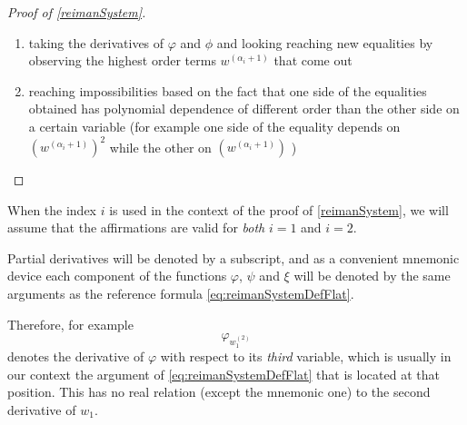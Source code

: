 \documentclass[12pt]{article}
\begin{document}
\begin{proof}[ Proof of \ref{reimanSystem}]
\begin{enumerate}
  \item taking the derivatives of $\varphi$ and $\phi$ and looking reaching new
  equalities by observing the highest order terms $w^{(\alpha_i + 1)}$ that come out
  \item reaching impossibilities based on the fact that one side of the equalities
  obtained has polynomial dependence of different order than the other side on a
  certain variable (for example one side of the equality depends on $(w^{(\alpha_i + 1)})^2$ while the other on $(w^{(\alpha_i + 1)})$ )
\end{enumerate}

\end{proof}

\begin{notation}[Index $i$] \label{indexIIsForOneAndTwo}
  When the index $i$ is used in the context of the proof of \ref{reimanSystem},
  we will assume that the affirmations are valid for \emph{both} $i=1$ and $i=2$.
\end{notation}

\begin{notation}[Derivatives] \label{derivativesOfComplicatedThings}
  Partial derivatives will be denoted by a subscript, and as a convenient mnemonic device
  each component of the functions $\varphi$, $\psi$ and $\xi$ will be denoted by the same arguments
  as the reference formula \eqref{eq:reimanSystemDefFlat}.
  
  Therefore, for example
  \[ \varphi_{w_1^{(2)}} \]
  denotes the derivative of $\varphi$ with respect to its \emph{third} variable, which is
  usually in our context the argument of \eqref{eq:reimanSystemDefFlat} that is located at that position.
  This has no real relation (except the mnemonic one) to the second derivative of $w_1$.
\end{notation}
\end{document}
